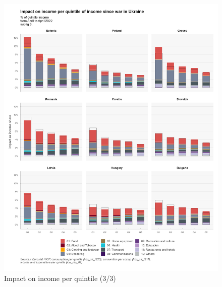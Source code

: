 \documentclass[
  9pt,
  a4paper,
  DIV=11,
  numbers=noendperiod,
  oneside]{scrartcl}
\begin{document}
\begin{figure}

\caption{Impact on income per quintile (3/3)}

{\centering \includegraphics[width=17cm,height=\textheight]{../svg/coicop_l1_1y_3.png}

}

\end{figure}
\end{document}

